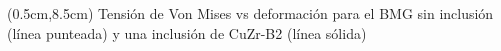 \begin{frame}
{\begin{textblock*}{12.6cm}
\begin{figure}[htp]
      \end{figure}
    \end{textblock*}
    \begin{textblock*}{12cm}(0.5cm,8.5cm) 
    \centering
      Tensión de Von Mises vs deformación para el BMG sin inclusión (línea punteada) y una inclusión de CuZr-B2 (línea sólida)
    \end{textblock*}
   }
\end{frame}


